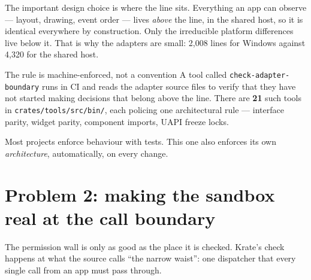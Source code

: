 \documentclass[11pt,a4paper]{report}
\begin{document}
The important design choice is where the line sits. Everything an app can
observe --- layout, drawing, event order --- lives \emph{above} the line, in
the shared host, so it is identical everywhere by construction. Only the
irreducible platform differences live below it. That is why the adapters are
small: 2{,}008 lines for Windows against 4{,}320 for the shared host.

\begin{factbox}{The rule is machine-enforced, not a convention}
A tool called \texttt{check-adapter-boundary} runs in CI and reads the
adapter source files to verify that they have not started making decisions
that belong above the line. There are \textbf{21} such tools in
\texttt{crates/tools/src/bin/}, each policing one architectural rule ---
interface parity, widget parity, component imports, UAPI freeze locks.

Most projects enforce behaviour with tests. This one also enforces its own
\emph{architecture}, automatically, on every change.
\end{factbox}

\section{Problem 2: making the sandbox real at the call boundary}

The permission wall is only as good as the place it is checked. Krate's
check happens at what the source calls ``the narrow waist'': one dispatcher
that every single call from an app must pass through.

\begin{center}
\end{center}
\end{document}
